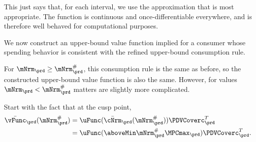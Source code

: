   This just says that, for each interval, we use the approximation that
  is most appropriate.  The function is continuous and
  once-differentiable everywhere, and is therefore well behaved for
  computational purposes.
  \begin{comment}
    In practice, in our problem the difference due to this refinement is displayed in Figure \ref{fig:IntExpFOCInvPesReaOpt45GapPlot}.
    \hypertarget{IntExpFOCInvPesReaOpt45GapPlot}{}
    \begin{figure}
      \texttt{[image: ./Figures/IntExpFOCInvPesReaOpt45GapPlot]}
      \caption{Difference Between $\Aprx{\Hi{\cFunc}}_{L, T-1}$ and $\Aprx{\Hi{\cFunc}}_{H,T-1}$ is Small}
      \label{fig:IntExpFOCInvPesReaOpt45GapPlot}
    \end{figure}
  \end{comment}

  We now construct an upper-bound value function implied for a consumer whose spending behavior is consistent with the refined upper-bound consumption rule.

  For $\mNrm_{\prd} \geq \mNrm_{\prd}^{\#}$, this consumption rule is the same as before,
  so the constructed upper-bound value function is also the same.  However, for
  values $\mNrm_{\prd} < \mNrm_{\prd}^{\#}$ matters are slightly more complicated.

  Start with the fact that at the cusp point,
  \begin{equation*}\begin{gathered}\begin{aligned}
        \bar{\vFunc}_{\prd}(\mtCusp)  & = \uFunc(\bar{\cNrm}_{\prd}(\mtCusp))\PDVCoverc_{\prd}^{T} \\
        & =  \uFunc(\aboveMin \mtCusp  \MPCmax_{\prd})\PDVCoverc_{\prd}^{T}
        .
      \end{aligned}\end{gathered}\end{equation*}

